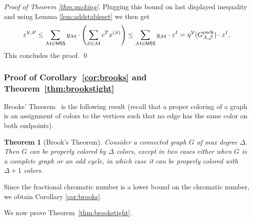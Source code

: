 \documentclass[smallextended]{svjour3}
\newtheorem{theorem}[proposition]{Theorem}
\begin{document}
\begin{proof}[Proof of Theorem \ref{thm:packing}]
	Plugging this bound on last displayed inequality and using Lemma  \ref{lem:addstableset} we then get
		\begin{align*}
		z^{{\mathcal{V}},P} \le \sum_{{\mathcal{M}} \in \sf{MSS}} y_{\mathcal{M}} \cdot \left(\sum_{S \in \mathcal{M}} c^T x^{(S)} \right) \leq \sum_{{\mathcal{M}} \in \sf{MSS}} y_{\mathcal{M}} \cdot z^I = \eta^{\mathcal{V}}({G^{\textrm{pack}}_{A, {\mathcal{J}}}}) \cdot z^I.
	\end{align*}
	This concludes the proof. {
\ifmp
	\hfill \qed
\fi
}
	\end{proof}

\subsubsection{Proof of Corollary~\ref{cor:brooks} and Theorem~\ref{thm:brookstight}}

Brooks' Theorem~\cite{brooks41} is the following result (recall that a proper coloring of a graph is an assignment of colors to the vertices such that no edge has the same color on both endpoints).

\begin{theorem}[Brook's Theorem]
Consider a connected graph $G$ of max degree $\Delta$. Then $G$ can be properly colored by $\Delta$ colors, except in two cases either when $G$ is a complete graph or an odd cycle, in which case it can be properly colored with $\Delta + 1$ colors.
\end{theorem}

Since the fractional chromatic number is a lower bound on the chromatic number, we obtain Corollary \ref{cor:brooks}. 

We now prove Theorem~\ref{thm:brookstight}.
\end{document}
